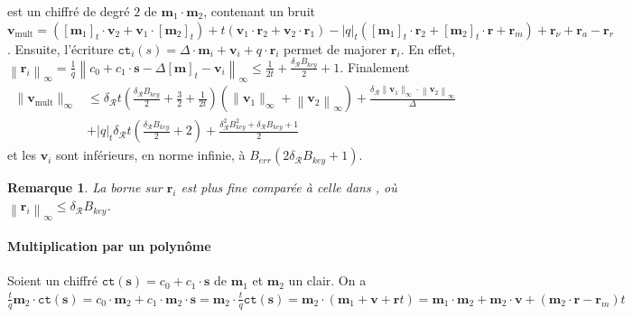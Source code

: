 \documentclass[11pt, headsepline, a4paper, fleqn, oneside]{article}
\newtheorem{rem}{Remarque}
\begin{document}
est un chiffré de degré $2$ de $\boldsymbol{m}_{1} \cdot \boldsymbol{m}_{2}$, contenant un bruit\\ $\boldsymbol{v}_{\mathrm{mult}} = \left([\boldsymbol{m}_{1}]_{t} \cdot \boldsymbol{v}_{2}+\boldsymbol{v}_{1} \cdot\left[\boldsymbol{m}_{2}\right]_{t}\right)+t\left(\boldsymbol{v}_{1} \cdot \boldsymbol{r}_{2} +\boldsymbol{v}_{2} \cdot \boldsymbol{r}_{1}\right)-|q|_{t}\left([\boldsymbol{m}_{1}]_{t} \cdot \boldsymbol{r}_{2}+\left[\boldsymbol{m}_{2}\right]_{t} \cdot \boldsymbol{r}+\boldsymbol{r}_{m}\right)+\boldsymbol{r}_{\nu}+\boldsymbol{r}_{a}-\boldsymbol{r}_{r}$. Ensuite, l'écriture $\texttt{ct}_i (s) = \Delta\cdot\boldsymbol{m}_i + \boldsymbol{v}_i + q\cdot\boldsymbol{r}_i$ permet de majorer $\boldsymbol{r}_i$. En effet, $\left\|\boldsymbol{r}_i\right\|_{\infty} = \frac{1}{q}\left\|c_0 + c_1 \cdot\boldsymbol{s} - \Delta[\boldsymbol{m}]_t - \boldsymbol{v}_i \right\|_{\infty}\leq \frac{1}{2t}+ \frac{\delta_\mathcal{R} B_{key}}{2} + 1$. Finalement
\begin{equation}\label{eq:11}
\begin{aligned}
\|\boldsymbol{v}_{\mathrm{mult}}\|_{\infty} &\leq \delta_{\mathcal{R}} t\left(\frac{\delta_{\mathcal{R}} B_{key}}{2}+\frac{3}{2} + \frac{1}{2t}\right)\left(\|\boldsymbol{v}_{1}\|_{\infty}+\left\|\boldsymbol{v}_{2}\right\|_{\infty}\right)+\frac{\delta_{\mathcal{R}}  \|\boldsymbol{v}_{1}\|_{\infty}\cdot\left\|\boldsymbol{v}_{2}\right\|_{\infty}}{\Delta} \\&+{|q|_{t} \delta_{\mathcal{R}} t\left(\frac{\delta_{\mathcal{R}} B_{key}}{2}+2\right)+\frac{\delta_{\mathcal{R}}^{2} B_{key}^{2}+\delta_{\mathcal{R}} B_{key}+1}{2}}
\end{aligned}
\end{equation}
et les $\boldsymbol{v}_{i}$ sont inférieurs, en norme infinie, à $B_{err}\left(2 \delta_{\mathcal{R}} B_{key}+1\right)$.
\begin{rem}
La borne sur $\boldsymbol{r}_i$ est plus fine comparée à celle dans \cite{fan2012somewhat}, où $\left\|\boldsymbol{r}_i\right\|_{\infty} \leq \delta_{\mathcal{R}} B_{key}$.
\end{rem}
\paragraph{Multiplication par un polynôme} Soient un chiffré $\texttt{ct}(\boldsymbol{s}) = c_0 + c_1 \cdot \boldsymbol{s}$ de $\boldsymbol{m}_1$ et $\boldsymbol{m}_2$ un clair. On a $\frac{t}{q}\boldsymbol{m}_2\cdot \texttt{ct}(\boldsymbol{s})= c_0 \cdot\boldsymbol{m}_2+c_1 \cdot\boldsymbol{m}_2\cdot\boldsymbol{s} = \boldsymbol{m}_2\cdot \frac{t}{q}\texttt{ct}(\boldsymbol{s})= \boldsymbol{m}_2\cdot(\boldsymbol{m}_1 + \boldsymbol{v} + \boldsymbol{r}t)= \boldsymbol{m}_1 \cdot \boldsymbol{m}_2 + \boldsymbol{m}_2 \cdot \boldsymbol{v}+ (\boldsymbol{m}_2 \cdot \boldsymbol{r} - \boldsymbol{r}_m )t$
\end{document}
